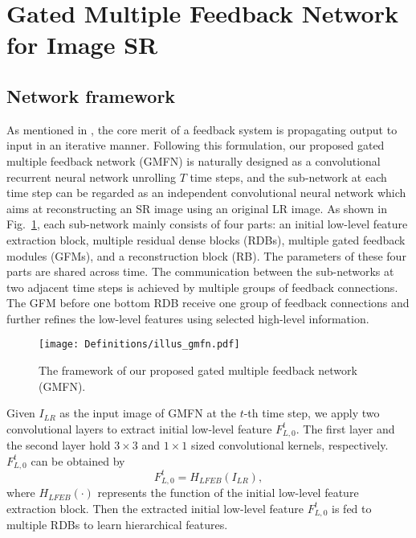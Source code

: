 \documentclass{bmvc2k}
\begin{document}
				\vspace{-4.2mm}	
	\section{Gated Multiple Feedback Network for Image SR}
	\subsection{Network framework}
	As mentioned in \cite{zamir2017feedback, li2019srfbn}, the core merit of a feedback system is propagating output to input in an iterative manner. Following this formulation, our proposed gated multiple feedback network (GMFN) is naturally designed as a convolutional recurrent neural network unrolling $T$ time steps, and the sub-network at each time step can be regarded as an independent convolutional neural network which aims at reconstructing an SR image using an original LR image. As shown in Fig.~\ref{fig:gmfn}, each sub-network mainly consists of four parts: an initial low-level feature extraction block, multiple residual dense blocks (RDBs), multiple gated feedback modules (GFMs), and a reconstruction block (RB). The parameters of these four parts are shared across time. The communication between the sub-networks at two adjacent time steps is achieved by multiple groups of feedback connections. The GFM before one bottom RDB receive one group of feedback connections and further refines the low-level features using selected high-level information.
	
	\label{sec:proposed}
	\begin{figure}[htbp]
		\centering
		\texttt{[image: Definitions/illus\_gmfn.pdf]}
		\vspace{-5mm}
		\caption{The framework of our proposed gated multiple feedback network (GMFN). }
		\label{fig:gmfn}
		\vspace{-5mm}
	\end{figure} 
	
	Given $I_{LR}$ as the input image of GMFN at the $t$-th time step, we apply two convolutional layers to extract initial low-level feature $F_{L,0}^{t}$. The first layer and the second layer hold $3\times3$ and $1\times1$ sized convolutional kernels, respectively. $F_{L,0}^{t}$ can be obtained by
	\begin{equation}
	F_{L,0}^{t}=H_{LFEB}\left(I_{LR}\right),
	\end{equation}
	where $H_{LFEB}(\cdot)$ represents the function of the initial low-level feature extraction block. Then the extracted initial low-level feature $F_{L,0}^{t}$ is fed to multiple RDBs to learn hierarchical features. 
	
\end{document}
